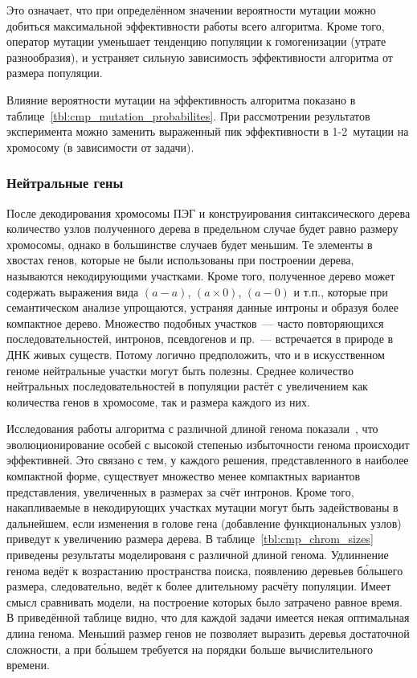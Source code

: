 Это означает, что при определённом значении вероятности мутации можно добиться максимальной эффективности работы всего алгоритма. Кроме того, оператор мутации уменьшает тенденцию популяции к гомогенизации (утрате разнообразия), и устраняет сильную зависимость эффективности алгоритма от размера популяции.

Влияние вероятности мутации на эффективность алгоритма показано в таблице~\ref{tbl:cmp_mutation_probabilites}. При рассмотрении результатов эксперимента можно заменить выраженный пик эффективности в 1-2~мутации на хромосому (в зависимости от задачи).




\subsubsection{Нейтральные гены}

После декодирования хромосомы ПЭГ и конструирования синтаксического дерева количество узлов полученного дерева в предельном случае будет равно размеру хромосомы, однако в большинстве случаев будет меньшим. Те элементы в хвостах генов, которые не были использованы при построении дерева, называются некодирующими участками. Кроме того, полученное дерево может содержать выражения вида $(a - a)$, $(a \times 0)$, $(a - 0)$ и т.п., которые при семантическом анализе упрощаются, устраняя данные интроны и образуя более компактное дерево. Множество подобных участков~--- часто повторяющихся последовательностей, интронов, псевдогенов и пр.~--- встречается в природе в ДНК живых существ. Потому логично предположить, что и в искусственном геноме нейтральные участки могут быть полезны. Среднее количество нейтральных последовательностей в популяции растёт с увеличением как количества генов в хромосоме, так и размера каждого из них.

Исследования работы алгоритма с различной длиной генома показали~\cite{journals/advcs/Ferreira02}, что эволюционирование особей с высокой степенью избыточности генома происходит эффективней. Это связано с тем, у каждого решения, представленного в наиболее компактной форме, существует множество менее компактных вариантов представления, увеличенных в размерах за счёт интронов. Кроме того, накапливаемые в некодирующих участках мутации могут быть задействованы в дальнейшем, если изменения в голове гена (добавление функциональных узлов) приведут к увеличению размера дерева. В таблице~\ref{tbl:cmp_chrom_sizes} приведены результаты моделированя с различной длиной генома. Удлиннение генома ведёт к возрастанию пространства поиска, появлению деревьев б\'{о}льшего размера, следовательно, ведёт к более длительному расчёту популяции. Имеет смысл сравнивать модели, на построение которых было затрачено равное время. В приведённой таблице видно, что для каждой задачи имеется некая оптимальная длина генома. Меньший размер генов не позволяет выразить деревья достаточной сложности, а при б\'{о}льшем требуется на порядки больше вычислительного времени.

